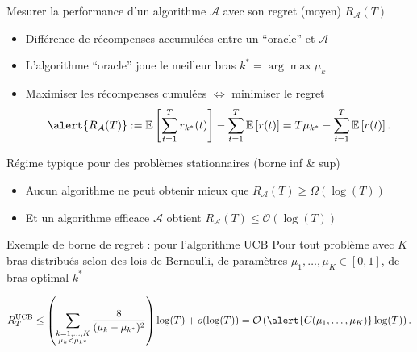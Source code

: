 \documentclass[11pt,english,ignorenonframetext,]{beamer}
\begin{document}
\begin{frame}{Mesurer la performance d'un algorithme $\mathcal{A}$ avec son regret (moyen) $R_{\mathcal{A}}(T)$}

\pause

\begin{itemize}
  \item
  Différence de récompenses accumulées entre un ``oracle'' et $\mathcal{A}$

  \item
  L'algorithme ``oracle'' joue le meilleur bras $k^* = \arg\max \mu_k$

  \item
  Maximiser les récompenses cumulées
  $\Longleftrightarrow$ \alert{minimiser le regret}
  \[ \alert{ R_{\mathcal{A}}(T) } := \mathbb{E}\left[ \sum\limits_{t=1}^T r_{k^*}(t) \right] - \sum\limits_{t=1}^T \mathbb{E}\left[ r(t) \right] = T \mu_{k^*} - \sum\limits_{t=1}^T \mathbb{E}\left[ r(t) \right]. \]

\end{itemize}

\pause
\vspace*{10pt}

\begin{exampleblock}{Régime typique pour des problèmes stationnaires (borne inf \& sup)}
  \begin{itemize}
  \item
  Aucun algorithme ne peut obtenir mieux que
  \hfill{}
  $R_{\mathcal{A}}(T) \geq \Omega(\log(T))$

  \item
  Et un algorithme efficace $\mathcal{A}$ obtient
  \hfill{}
  $R_{\mathcal{A}}(T) \leq \mathcal{O}(\log(T))$
  \end{itemize}
\end{exampleblock}

\pause

\begin{exampleblock}{Exemple de borne de regret : pour l'algorithme UCB}
  Pour tout problème avec $K$ bras distribués selon des lois de Bernoulli, de paramètres $\mu_1,\dots,\mu_K \in[0,1]$, de bras optimal $k^*$
  \begin{small}
    \[ R_T^{\mathrm{UCB}} \leq \left( \sum_{\substack{k=1,\dots,K \\ \mu_k < \mu_{k^*}}} \frac{8}{(\mu_k - \mu_{k^*})^2} \right) \log(T) + o(\log(T)) = \mathcal{O}\left( \alert{C(\mu_1,\dots,\mu_K)} \log(T) \right). \]
  \end{small}%
\end{exampleblock}

\end{frame}
\end{document}

